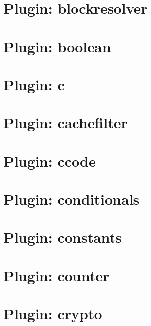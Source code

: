 \documentclass[twoside]{book}
\newcommand{\+}{\discretionary{\mbox{\scriptsize$\hookleftarrow$}}{}{}}
\begin{document}
\chapter{Plugin\+: blockresolver}
\label{md_src_plugins_blockresolver_README}
\hypertarget{md_src_plugins_blockresolver_README}{}

\chapter{Plugin\+: boolean}
\label{md_src_plugins_boolean_README}
\hypertarget{md_src_plugins_boolean_README}{}

\chapter{Plugin\+: c}
\label{md_src_plugins_c_README}
\hypertarget{md_src_plugins_c_README}{}

\chapter{Plugin\+: cachefilter}
\label{md_src_plugins_cachefilter_README}
\hypertarget{md_src_plugins_cachefilter_README}{}

\chapter{Plugin\+: ccode}
\label{md_src_plugins_ccode_README}
\hypertarget{md_src_plugins_ccode_README}{}

\chapter{Plugin\+: conditionals}
\label{md_src_plugins_conditionals_README}
\hypertarget{md_src_plugins_conditionals_README}{}

\chapter{Plugin\+: constants}
\label{md_src_plugins_constants_README}
\hypertarget{md_src_plugins_constants_README}{}

\chapter{Plugin\+: counter}
\label{md_src_plugins_counter_README}
\hypertarget{md_src_plugins_counter_README}{}

\chapter{Plugin\+: crypto}
\label{md_src_plugins_crypto_README}
\hypertarget{md_src_plugins_crypto_README}{}

\end{document}
